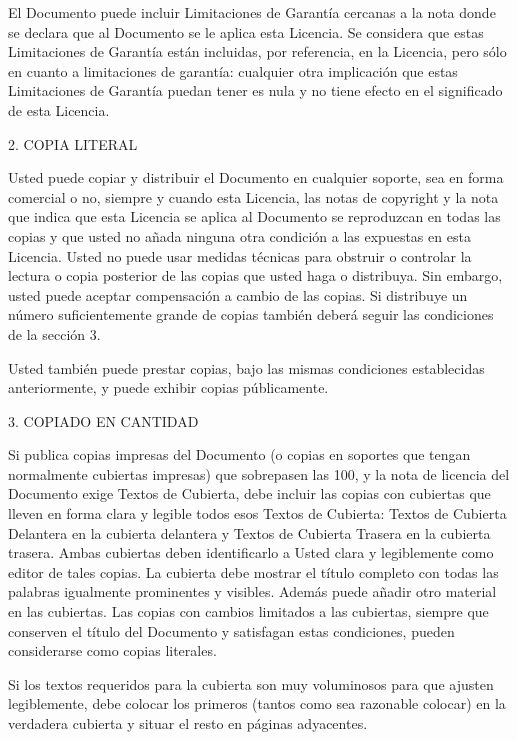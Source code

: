 \documentclass[a4paper, 11pt, oneside]{report}
\begin{document}
El Documento puede incluir Limitaciones de Garantía cercanas a la nota donde se declara que al Documento se le aplica esta Licencia. Se considera que estas Limitaciones de Garantía están incluidas, por referencia, en la Licencia, pero sólo en cuanto a limitaciones de garantía: cualquier otra implicación que estas Limitaciones de Garantía puedan tener es nula y no tiene efecto en el significado de esta Licencia.

2. COPIA LITERAL

Usted puede copiar y distribuir el Documento en cualquier soporte, sea en forma comercial o no, siempre y cuando esta Licencia, las notas de copyright y la nota que indica que esta Licencia se aplica al Documento se reproduzcan en todas las copias y que usted no añada ninguna otra condición a las expuestas en esta Licencia. Usted no puede usar medidas técnicas para obstruir o controlar la lectura o copia posterior de las copias que usted haga o distribuya. Sin embargo, usted puede aceptar compensación a cambio de las copias. Si distribuye un número suficientemente grande de copias también deberá seguir las condiciones de la sección 3.

Usted también puede prestar copias, bajo las mismas condiciones establecidas anteriormente, y puede exhibir copias públicamente.

3. COPIADO EN CANTIDAD

Si publica copias impresas del Documento (o copias en soportes que tengan normalmente cubiertas impresas) que sobrepasen las 100, y la nota de licencia del Documento exige Textos de Cubierta, debe incluir las copias con cubiertas que lleven en forma clara y legible todos esos Textos de Cubierta: Textos de Cubierta Delantera en la cubierta delantera y Textos de Cubierta Trasera en la cubierta trasera. Ambas cubiertas deben identificarlo a Usted clara y legiblemente como editor de tales copias. La cubierta debe mostrar el título completo con todas las palabras igualmente prominentes y visibles. Además puede añadir otro material en las cubiertas. Las copias con cambios limitados a las cubiertas, siempre que conserven el título del Documento y satisfagan estas condiciones, pueden considerarse como copias literales.

Si los textos requeridos para la cubierta son muy voluminosos para que ajusten legiblemente, debe colocar los primeros (tantos como sea razonable colocar) en la verdadera cubierta y situar el resto en páginas adyacentes.
\end{document}
